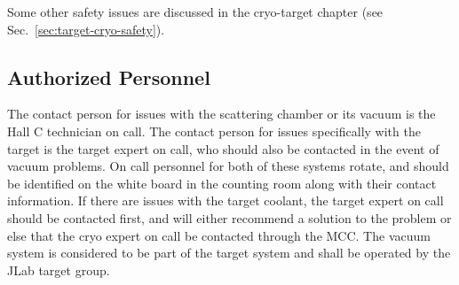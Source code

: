 {\begin{safetyen}{0}{0}
\begin{list}{.~}{\setlength{\itemsep}{-0.15cm}}
\end{list}

Some other safety issues are discussed in the cryo-target chapter (see
Sec.~\ref{sec:target-cryo-safety}).

\subsection[Authorized  Personnel]{Authorized  Personnel}

The contact person for issues with the scattering chamber or its
vacuum is the Hall C technician on call. The contact person for issues
specifically with the target is the target expert on call, who should
also be contacted in the event of vacuum problems.  On call personnel
for both of these systems rotate, and should be identified on the
white board in the counting room along with their contact information.
If there are issues with the target coolant, the target expert on call
should be contacted first, and will either recommend a solution to the
problem or else that the cryo expert on call be contacted through the
MCC. The vacuum system is considered to be part of the target system
and shall be operated by the JLab target group.
\end{safetyen}
}
%

